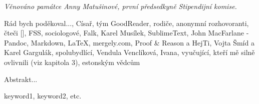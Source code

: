 \documentclass[12pt,twoside,draft]{fithesis2}
\begin{document}
\FrontMatter
\ThesisTitlePage

\begin{ThesisDeclaration}
\DeclarationText
\AdvisorName
\end{ThesisDeclaration}

\begin{ThesisDedication}
\vspace*{10cm}
\noindent
\emph{Věnováno památce Anny Matušinové, \newline první předsedkyně Stipendijní komise.}

\newpage
\thispagestyle{empty}
\mbox{}

\end{ThesisDedication}

\begin{ThesisThanks}
Rád bych poděkoval..., Císař, tým GoodReader, rodiče, anonymní rozhovoranti, čteči [], FSS, sociologové, Falk, Karel Musílek, SublimeText, John MacFarlane - Pandoc, Markdown, LaTeX, mergely.com, Proof \& Reason a HejTi, Vojta Šmíd a Karel Gargulák, spolubydlící, Vendula Venclíková, Ivana, vyučující, kteří mě silně ovlivnili (viz kapitola 3), estonským vědcům
\end{ThesisThanks}

\begin{ThesisAbstract}
Abstrakt...
\end{ThesisAbstract}

\begin{ThesisKeyWords}
keyword1, keyword2, etc.
\end{ThesisKeyWords}

\MainMatter

\tableofcontents          %







\end{document}
